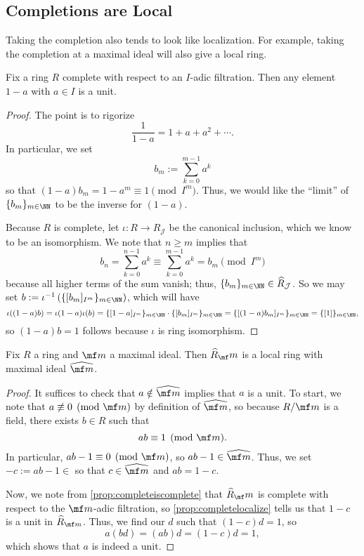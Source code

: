 \subsection{Completions are Local}
Taking the completion also tends to look like localization. For example, taking the completion at a maximal ideal will also give a local ring.
\begin{proposition} \label{prop:completelocalize}
	Fix a ring $R$ complete with respect to an $I$-adic filtration. Then any element $1-a$ with $a\in I$ is a unit.
\end{proposition}
\begin{proof}
	The point is to rigorize
	\[\frac1{1-a}=1+a+a^2+\cdots.\]
	In particular, we set
	\[b_m:=\sum_{k=0}^{m-1}a^k\]
	so that $(1-a)b_m=1-a^m\equiv1\pmod{I^m}$. Thus, we would like the ``limit'' of $\{b_m\}_{m\in\NN}$ to be the inverse for $(1-a)$.
	
	Because $R$ is complete, let $\iota:R\to\widehat R_\mathcal J$ be the canonical inclusion, which we know to be an isomorphism. We note that $n\ge m$ implies that
	\[b_n=\sum_{k=0}^{n-1}a^k\equiv\sum_{k=0}^{m-1}a^k=b_m\pmod{I^m}\]
	because all higher terms of the sum vanish; thus, $\{b_m\}_{m\in\NN}\in\widehat R_\mathcal J$. So we may set $b:=\iota^{-1}\left(\{[b_m]_{I^m}\}_{m\in\NN}\right)$, which will have
	\[\iota((1-a)b)=\iota(1-a)\iota(b)=\{[1-a]_{I^m}\}_{m\in\NN}\cdot\{[b_m]_{I^m}\}_{m\in\NN}=\{[(1-a)b_m]_{I^m}\}_{m\in\NN}=\{[1]\}_{m\in\NN},\]
	so $(1-a)b=1$ follows because $\iota$ is ring isomorphism.
\end{proof}
\begin{corollary}
	Fix $R$ a ring and $\mf m$ a maximal ideal. Then $\widehat R_\mf m$ is a local ring with maximal ideal $\widehat{\mf m}$.
\end{corollary}
\begin{proof}
	It suffices to check that $a\notin\widehat{\mf m}$ implies that $a$ is a unit. To start, we note that $a\not\equiv0\pmod{\mf m}$ by definition of $\widehat{\mf m}$, so because $R/\mf m$ is a field, there exists $b\in R$ such that
	\[ab\equiv1\pmod{\mf m}.\]
	In particular, $ab-1\equiv0\pmod{\mf m}$, so $ab-1\in\widehat{\mf m}$. Thus, we set $-c:=ab-1\in$ so that $c\in\widehat{\mf m}$ and $ab=1-c$.
	
	Now, we note from \autoref{prop:completeiscomplete} that $\widehat R_\mf m$ is complete with respect to the $\mf m$-adic filtration, so \autoref{prop:completelocalize} tells us that $1-c$ is a unit in $\widehat R_{\mf m}$. Thus, we find our $d$ such that $(1-c)d=1$, so
	\[a(bd)=(ab)d=(1-c)d=1,\]
	which shows that $a$ is indeed a unit.
\end{proof}
